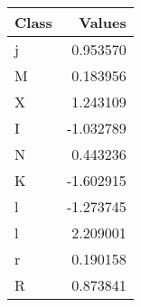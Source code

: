 \begin{tabular}{lr}
\toprule
Class & Values \\
\midrule
j & 0.953570 \\
M & 0.183956 \\
X & 1.243109 \\
I & -1.032789 \\
N & 0.443236 \\
K & -1.602915 \\
l & -1.273745 \\
l & 2.209001 \\
r & 0.190158 \\
R & 0.873841 \\
\bottomrule
\end{tabular}

